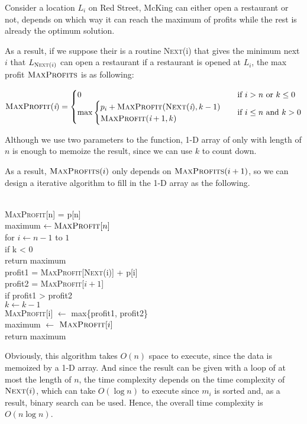 \documentclass[11pt]{article}
\begin{document}
\begin{solution}
	Consider a location $L_i$ on Red Street, McKing can either open a restaurant or not, depends on which way it can reach the maximum of profits while the rest is already the optimum solution. 
	
	As a result, if we suppose their is a routine \textsc{Next}(i) that gives the minimum next $i$ that $L_{\textsc{Next}(i)}$ can open a restaurant if a restaurant is opened at $L_i$, the max profit $\textsc{MaxProfits}$ is as following:
	
	\[\textsc{MaxProfit}(\textit{i}) = 
		\begin{cases}
			0 & \text{if }i > n \text{ or } k \leq 0\\
			\max \begin{cases}
					p_i + \textsc{MaxProfit}(\textsc{Next}(\textit{i}), k - 1)\\
					\textsc{MaxProfit}(\textit{i} + 1, k)
				 \end{cases} & \text{if } i \leq n \text{ and } k > 0
		\end{cases} \]
		
	Although we use two parameters to the function, 1-D array of only with length of $n$ is enough to memoize the result, since we can use $k$ to count down.
	
	As a result, $\textsc{MaxProfits}(i)$ only depends on $\textsc{MaxProfits}(i + 1)$, so we can design a iterative algorithm to fill in the 1-D array as the following.
	
	\begin{center}
		\begin{algorithm}
			\+
			\\\textsc{MaxProfit}[n] = p[n]
			\\maximum $\gets \textsc{MaxProfit}[n]$
			\\for $i \gets n - 1$ to $1$\+
			\\ if k < $0$\+
			\\	return maximum\-
			\\	profit1 = \textsc{MaxProfit}[\textsc{Next}(i)] + p[i]
			\\ profit2 = \textsc{MaxProfit}[$i+1$] 
			\\ if profit1 > profit2\+
			\\	$k \gets k - 1$\-
			\\ \textsc{MaxProfit}[i] $\gets$ max\{profit1, profit2\}
			\\ maximum $\gets$ $\textsc{MaxProfit}[i]$\-
			\\ return maximum
			
		\end{algorithm}
	\end{center}
	
	Obviously, this algorithm takes $O(n)$ space to execute, since the data is memoized by a 1-D array. And since the result can be given with a loop of at most the length of $n$, the time complexity depends on the time complexity of $\textsc{Next}(i)$, which can take $O(\log n)$ to execute since $m_i$ is sorted and, as a result, binary search can be used. Hence, the overall time complexity is $O(n \log n)$. 
\end{solution}
\clearpage
\end{document}
